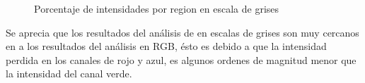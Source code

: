 \documentclass[11pt,letterpaper,twocolumn]{article}
\begin{document}
\begin{figure}[h!]
\begin{center}
\caption{Porcentaje de intensidades por region en escala de grises}
\end{center}
\end{figure}
\par 
Se aprecia que los resultados del análisis de en escalas de grises son muy cercanos en a los resultados del análisis en RGB, ésto es debido  a que la intensidad perdida en los canales de rojo y azul, es algunos ordenes de magnitud menor que la intensidad del canal verde.
\end{document}
